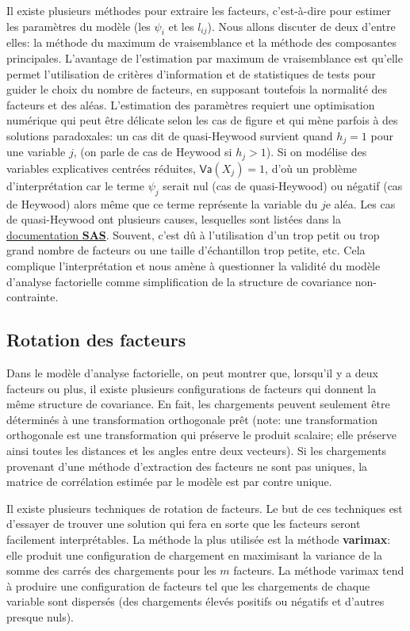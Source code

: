 \documentclass[
  11pt,
  letterpaper,
]{book}
\theoremstyle{definition}
\theoremstyle{definition}
\theoremstyle{definition}
\theoremstyle{remark}
\begin{document}
Il existe plusieurs méthodes pour extraire les facteurs, c'est-à-dire pour estimer les paramètres du modèle (les \(\psi_i\) et les \(l_{ij}\)). Nous allons discuter de deux d'entre elles: la méthode du maximum de vraisemblance et la méthode des composantes principales. L'avantage de l'estimation par maximum de vraisemblance est qu'elle permet l'utilisation de critères d'information et de statistiques de tests pour guider le choix du nombre de facteurs, en supposant toutefois la normalité des facteurs et des aléas. L'estimation des paramètres requiert une optimisation numérique qui peut être délicate selon les cas de figure et qui mène parfois à des solutions paradoxales: un cas dit de quasi-Heywood survient quand \(h_j=1\) pour une variable \(j\), (on parle de cas de Heywood si \(h_j > 1\)). Si on modélise des variables explicatives centrées réduites, \(\mathsf{Va}(X_j)=1\), d'où un problème d'interprétation car le terme \(\psi_j\) serait nul (cas de quasi-Heywood) ou négatif (cas de Heywood) alors même que ce terme représente la variable du \(j\)e aléa. Les cas de quasi-Heywood ont plusieurs causes, lesquelles sont listées dans la \href{https://support.sas.com/documentation/cdl/en/statug/63033/HTML/default/viewer.htm\#statug_factor_sect022.htm}{documentation \textbf{SAS}}. Souvent, c'est dû à l'utilisation d'un trop petit ou trop grand nombre de facteurs ou une taille d'échantillon trop petite, etc. Cela complique l'interprétation et nous amène à questionner la validité du modèle d'analyse factorielle comme simplification de la structure de covariance non-contrainte.

\hypertarget{rotation-des-facteurs}{%
\subsection{Rotation des facteurs}\label{rotation-des-facteurs}}

Dans le modèle d'analyse factorielle, on peut montrer que, lorsqu'il y a deux facteurs ou plus, il existe plusieurs configurations de facteurs qui donnent la même structure de covariance. En fait, les chargements peuvent seulement être déterminés à une transformation orthogonale prêt (note: une transformation orthogonale est une transformation qui préserve le produit scalaire; elle préserve ainsi toutes les distances et les angles entre deux vecteurs). Si les chargements provenant d'une méthode d'extraction des facteurs ne sont pas uniques, la matrice de corrélation estimée par le modèle est par contre unique.

Il existe plusieurs techniques de rotation de facteurs. Le but de ces techniques est d'essayer de trouver une solution qui fera en sorte que les facteurs seront facilement interprétables. La méthode la plus utilisée est la méthode \textbf{varimax}: elle produit une configuration de chargement en maximisant la variance de la somme des carrés des chargements pour les \(m\) facteurs. La méthode varimax tend à produire une configuration de facteurs tel que les chargements de chaque variable sont dispersés (des chargements élevés positifs ou négatifs et d'autres presque nuls).
\end{document}
